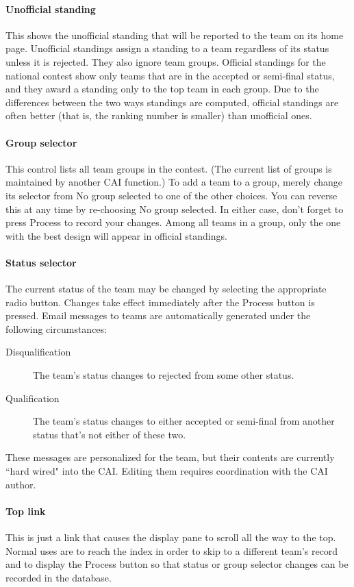 \documentclass[11pt,letterpaper]{refart}
\def\ui#1{\textsf{#1}}
\begin{document}
\paragraph{Unofficial standing}
This shows the unofficial standing that will be reported to the team on its home
page. Unofficial standings assign a standing to a team regardless of its status 
unless it is rejected. They also ignore team groups. Official standings for 
the national contest show only teams
that are in the accepted or semi-final status, and they award a standing only to
the top team in each group. Due to the differences between the two ways 
standings are computed, official standings are often better (that is, the ranking 
number is smaller) than unofficial ones.

\paragraph{Group selector}
This control lists all team groups in the contest. (The current list
of groups is maintained by another CAI function.)
To add a team to a group, merely 
change its selector from \ui{No group selected} to one of the other choices. You 
can reverse this at any time by re-choosing \ui{No group selected}. In either case,
don't forget to press \ui{Process} to record your changes. Among all teams
in a group, only the one with the best design will appear in official standings.

\paragraph{Status selector}
The current status of the team may be changed by selecting the appropriate
radio button. Changes take effect immediately after the \ui{Process} button is
pressed. Email messages to teams are automatically generated under the 
following circumstances:
\begin{description}
\item[Disqualification] The team's status changes to rejected from some other status.
\item[Qualification] The team's status changes to either accepted or
semi-final from another status that's not either of these two.
\end{description}
These messages are personalized for the team, but their contents are currently
``hard wired" into the CAI. Editing them requires coordination with the CAI 
author.

\paragraph{Top link}
This is just a link that causes the display pane to scroll all the way to the top.
Normal uses are to reach the index in order to skip to a different team's record
and to display the \ui{Process} button so that status or group selector changes
can be recorded in the database.
\end{document}
